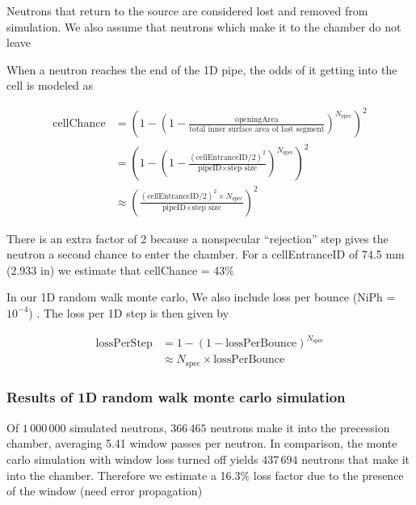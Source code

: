 Neutrons that return to the source are considered lost and removed from simulation. We also assume that neutrons which make it to the chamber do not leave

When a neutron reaches the end of the 1D pipe, the odds of it getting into the cell is modeled as

\begin{align}
    \text{cellChance} &= \left(1 - \left( 1 - \frac{ \text{openingArea} } {\text{total inner surface area of last segment}} \right) ^ {N_\text{spec}} \right)^2 \\
    &= \left(1 - \left( 1 - \frac{ (\text{cellEntranceID}/2)^{2} } {\text{pipeID}\times\text{step size}} \right) ^ {N_\text{spec}} \right) ^2 \\
    &\approx \left( \frac{ (\text{cellEntranceID}/2)^{2} \times N_\text{spec} } {\text{pipeID}\times\text{step size}} \right)^2
\end{align}

There is an extra factor of 2 because a nonspecular ``rejection'' step gives the neutron a second chance to enter the chamber. For a cellEntranceID of 74.5 mm (2.933 in) we estimate that cellChance = 43\%

In our 1D random walk monte carlo, We also include loss per bounce (NiPh = $10^{-4}$) \cite{pattie_jr_evaluation_2017}. The loss per 1D step is then given by

\begin{align}
    \text{lossPerStep} &= 1 - \left(1 - \text{lossPerBounce} \right)^{N_\text{spec}}\\
    &\approx N_\text{spec} \times \text{lossPerBounce}
\end{align}

\subsubsection{Results of 1D random walk monte carlo simulation}

Of $1\,000\,000$ simulated neutrons, $366\,465$ neutrons make it into the precession chamber, averaging 5.41 window passes per neutron. In comparison, the monte carlo simulation with window loss turned off yields $437\,694$ neutrons that make it into the chamber. Therefore we estimate a 16.3\% loss factor due to the presence of the window (need error propagation)